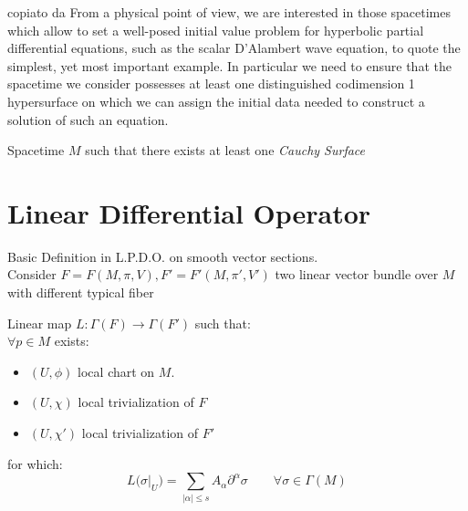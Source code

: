 \documentclass[a4paper,12pt]{scrartcl}    %
\begin{document}
		\begin{Warning}
		\danger copiato da \cite{primer}
		From a physical point of view, we are interested in those spacetimes which allow to set a well-posed
initial value problem for hyperbolic partial differential equations, such as the scalar D’Alambert wave equation, to quote the simplest, yet most important example. In particular we need to ensure that the spacetime we consider possesses at least one distinguished codimension 1 hypersurface on which we can assign the initial data needed to construct a solution of such an equation.	
		\end{Warning}	
		
		\begin{definition}
		 Spacetime $M$ such that there exists at least one \emph{Cauchy Surface}
		\end{definition}
		


\section{Linear Differential Operator}
Basic Definition in L.P.D.O. on smooth vector sections.
\\
Consider $F=F(M,\pi,V), F'=F'(M,\pi',V')$ two linear vector bundle over $M$ with different typical fiber
	\begin{definition}
		Linear map $L:\Gamma(F)\rightarrow \Gamma(F')$ such that:
		\\
		$\forall p \in M$ exists:
		\begin{itemize}
			\item $(U, \phi)$ local chart on $M$.
			\item $(U, \chi)$ local trivialization of $F$
			\item $(U, \chi')$ local trivialization of $F'$
		\end{itemize}
		for which:
		\begin{displaymath}
			L \big(\sigma \big\vert_U\big) = \sum_{\vert \alpha \vert \leq s} A_\alpha \partial^\alpha \sigma \qquad \forall \sigma \in \Gamma(M)
		\end{displaymath}
	\end{definition}
\end{document}
